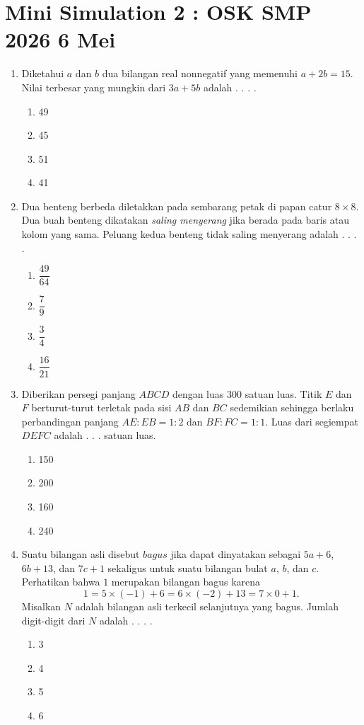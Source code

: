 \documentclass[12pt, a4paper]{scrartcl}
\begin{document}
\section*{Mini Simulation 2 : OSK SMP 2026 6 Mei}
\begin{enumerate}
    \item Diketahui $a$ dan $b$ dua bilangan real nonnegatif yang memenuhi $a+2b=15$. Nilai terbesar yang mungkin dari $3a+5b$ adalah . . . .
    \begin{enumerate}[label={(\Alph*)}]
        \item 49 \item 45 \item 51 \item 41
    \end{enumerate}

    \item Dua benteng berbeda diletakkan pada sembarang petak di papan catur $8\times 8$. Dua buah benteng dikatakan \textit{saling menyerang} jika berada pada baris atau kolom yang sama. Peluang kedua benteng tidak saling menyerang adalah . . . .
    \begin{enumerate}[label={(\Alph*)}]
        \item $\dfrac{49}{64}$ \item $\dfrac{7}{9}$ \item $\dfrac{3}{4}$ \item $\dfrac{16}{21}$
    \end{enumerate}

    \item Diberikan persegi panjang $ABCD$ dengan luas $300$ satuan luas. Titik $E$ dan $F$ berturut-turut terletak pada sisi $AB$ dan $BC$ sedemikian sehingga berlaku perbandingan panjang $AE:EB=1:2$ dan $BF:FC=1:1$. Luas dari segiempat $DEFC$ adalah . . . satuan luas.
    \begin{enumerate}[label={(\Alph*)}]
        \item 150 \item 200 \item 160 \item 240
    \end{enumerate}

    \item Suatu bilangan asli disebut $bagus$ jika dapat dinyatakan sebagai $5a+6$, $6b+13$, dan $7c+1$ sekaligus untuk suatu bilangan bulat $a$, $b$, dan $c$. Perhatikan bahwa $1$ merupakan bilangan bagus karena
    $$1 = 5\times (-1)+6 = 6\times (-2) +13 = 7\times 0+1.$$
    Misalkan $N$ adalah bilangan asli terkecil selanjutnya yang bagus. Jumlah digit-digit dari $N$ adalah . . . .
    \begin{enumerate}[label={(\Alph*)}]
        \item 3 \item 4 \item 5 \item 6
    \end{enumerate}


\end{enumerate}
\end{document}
